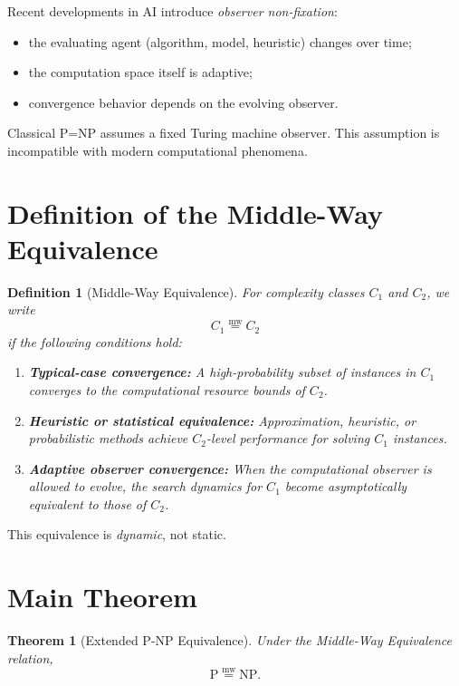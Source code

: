 \documentclass[12pt]{article}
\newcommand{\mweq}{\mathrel{\overset{\mathrm{mw}}{=}}}
\newtheorem{definition}{Definition}
\newtheorem{theorem}{Theorem}
\begin{document}
Recent developments in AI introduce \emph{observer non-fixation}:

\begin{itemize}
    \item the evaluating agent (algorithm, model, heuristic) changes over time;
    \item the computation space itself is adaptive;
    \item convergence behavior depends on the evolving observer.
\end{itemize}

Classical P=NP assumes a fixed Turing machine observer.  
This assumption is incompatible with modern computational phenomena.

\section{Definition of the Middle-Way Equivalence}

\begin{definition}[Middle-Way Equivalence]
For complexity classes $C_1$ and $C_2$, we write
\[
C_1 \mweq C_2
\]
if the following conditions hold:

\begin{enumerate}
    \item \textbf{Typical-case convergence:} 
    A high-probability subset of instances in $C_1$ converges to the computational 
    resource bounds of $C_2$.
    \item \textbf{Heuristic or statistical equivalence:} 
    Approximation, heuristic, or probabilistic methods achieve $C_2$-level 
    performance for solving $C_1$ instances.
    \item \textbf{Adaptive observer convergence:}
    When the computational observer is allowed to evolve,
    the search dynamics for $C_1$ become asymptotically equivalent to those of $C_2$.
\end{enumerate}
\end{definition}

This equivalence is \emph{dynamic}, not static.

\section{Main Theorem}

\begin{theorem}[Extended P-NP Equivalence]
Under the Middle-Way Equivalence relation,
\[
\mathrm{P} \mweq \mathrm{NP}.
\]
\end{theorem}
\end{document}
